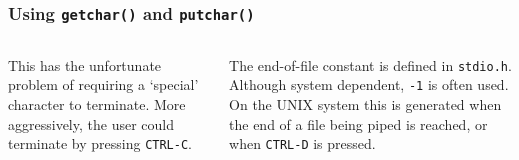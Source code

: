 \begin{frame}[fragile]
\frametitle{Using {\tt getchar()} and {\tt putchar()}}
\begin{columns}[T]
\begin{column}{0.45\textwidth}



{\footnotesize
This has the unfortunate problem of requiring a `special' character to terminate.
More aggressively, the user could terminate by pressing {\tt CTRL-C}.
}
\end{column}

\begin{column}{0.45\textwidth}



{\footnotesize
The end-of-file constant is defined in {\tt stdio.h}. Although
system dependent, {\tt -1} is often used. On the UNIX system
this is generated when the end of a file being piped is reached,
or when {\tt CTRL-D} is pressed.
}
\end{column}
\end{columns}
\end{frame}



